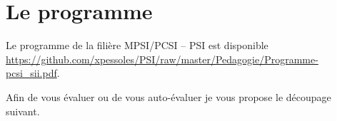 \section{Le programme}
Le programme de la filière MPSI/PCSI -- PSI est disponible \url{https://github.com/xpessoles/PSI/raw/master/Pedagogie/Programme-pcsi_sii.pdf}. 

Afin de vous évaluer ou de vous auto-évaluer je vous propose le découpage suivant.

\begin{multicols}{2}
\allCompWide
\end{multicols}
